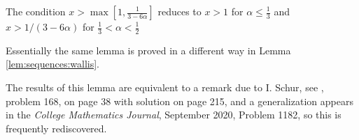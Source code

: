 \documentclass[12pt]{article}
\begin{document}
\begin{remark}
    The condition \( x > \max \left[ 1, \frac{1}{3-6\alpha} \right] \)
    reduces to \( x > 1 \) for \( \alpha \le \frac{1}{3} \) and \( x >
    1/(3-6\alpha) \) for \( \frac{1}{3} < \alpha < \frac{1}{2} \)
\end{remark}

\begin{remark}
    Essentially the same lemma is proved in a different way in Lemma~%
    \ref{lem:sequences:wallis}.
\end{remark}

\begin{remark}
    The results of this lemma are equivalent to a remark due to I.
    Schur, see
    \cite{polya98}, problem 168, on page 38 with solution on page 215,
    and a generalization appears in the \textit{College Mathematics
    Journal}, September 2020, Problem 1182, so this is frequently
    rediscovered.
\end{remark}
\end{document}
